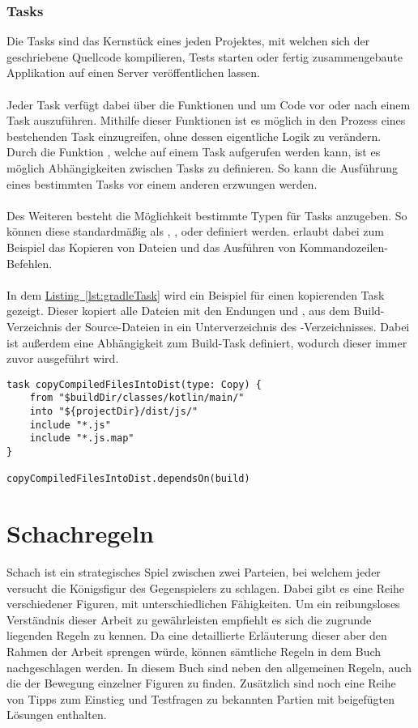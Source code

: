 \subsubsection{Tasks}
Die Tasks sind das Kernstück eines jeden Projektes, mit welchen sich der geschriebene Quellcode kompilieren, Tests starten oder fertig zusammengebaute Applikation auf einen Server veröffentlichen lassen.\\
\\
Jeder Task verfügt dabei über die Funktionen  und  um Code vor oder nach einem Task auszuführen. Mithilfe dieser Funktionen ist es möglich in den Prozess eines bestehenden Task einzugreifen, ohne dessen eigentliche Logik zu verändern. Durch die Funktion , welche auf einem Task aufgerufen werden kann, ist es möglich Abhängigkeiten zwischen Tasks zu definieren. So kann die Ausführung eines bestimmten Tasks vor einem anderen erzwungen werden.\\
\\
Des Weiteren besteht die Möglichkeit bestimmte Typen für Tasks anzugeben. So können diese standardmäßig als , ,  oder  definiert werden.  erlaubt dabei zum Beispiel das Kopieren von Dateien und  das Ausführen von Kommandozeilen-Befehlen.\\
\\
In dem \hyperref[lst:gradleTask]{Listing~\ref{lst:gradleTask}} wird ein Beispiel für einen kopierenden Task gezeigt. Dieser kopiert alle Dateien mit den Endungen  und , aus dem Build-Verzeichnis der Source-Dateien in ein Unterverzeichnis  des -Verzeichnisses. Dabei ist außerdem eine Abhängigkeit zum Build-Task definiert, wodurch dieser immer zuvor ausgeführt wird.\\
\begin{lstlisting}[style=lstStyleFramed, language=Gradle, caption={Beispiel: Gradle-Task}, label=lst:gradleTask, float]
task copyCompiledFilesIntoDist(type: Copy) {
	from "$buildDir/classes/kotlin/main/"
	into "${projectDir}/dist/js/"
	include "*.js"
	include "*.js.map"
}

copyCompiledFilesIntoDist.dependsOn(build)
\end{lstlisting}

\section{Schachregeln}
Schach ist ein strategisches Spiel zwischen zwei Parteien, bei welchem jeder versucht die Königsfigur des Gegenspielers zu schlagen. Dabei gibt es eine Reihe verschiedener Figuren, mit unterschiedlichen Fähigkeiten. Um ein reibungsloses Verständnis dieser Arbeit zu gewährleisten empfiehlt es sich die zugrunde liegenden Regeln zu kennen. Da eine detaillierte Erläuterung dieser aber den Rahmen der Arbeit sprengen würde, können sämtliche Regeln in dem Buch \cite{learnChess} nachgeschlagen werden. In diesem Buch sind neben den allgemeinen Regeln, auch die der Bewegung einzelner Figuren zu finden. Zusätzlich sind noch eine Reihe von Tipps zum Einstieg und Testfragen zu bekannten Partien mit beigefügten Lösungen enthalten.


